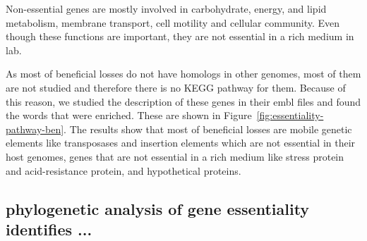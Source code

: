 \documentclass[12pt,letterpaper]{article}
\begin{document}
Non-essential genes are mostly involved in carbohydrate, energy, and lipid metabolism, membrane transport, cell motility and cellular community. Even though these functions are important, they are not essential in a rich medium in lab.

As most of beneficial losses do not have homologs in other genomes, most of them are not studied and therefore there is no KEGG pathway for them. Because of this reason, we studied the description of these genes in their embl files and found the words that were enriched. These are shown in Figure~\ref{fig:essentiality-pathway-ben}. The results show that most of beneficial losses are mobile genetic elements like transposases and insertion elements which are not essential in their host genomes, genes that are not essential in a rich medium like stress protein and acid-resistance protein, and hypothetical proteins.

\subsection{phylogenetic analysis of gene essentiality identifies ...}
\end{document}
